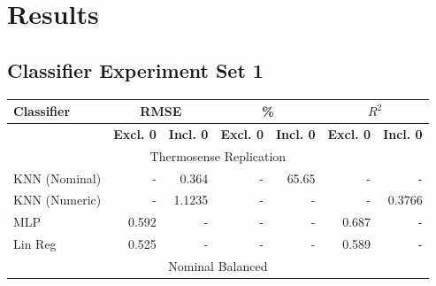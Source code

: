 \documentclass[../thesis/thesis.tex]{subfiles}
\begin{document}
 \chapter{Results}



 \section{Classifier Experiment Set 1}


\begin{table}
\centering
\begin{tabular}{|l|r|r|r|r|r|r|}
\hline
\textbf{Classifier} & \multicolumn{2}{c|}{\textbf{RMSE}}                                            & \multicolumn{2}{c|}{\textbf{\%}}                                              & \multicolumn{2}{c|}{\textbf{$R^2$}}                                           \\ \hline
                    & \multicolumn{1}{l|}{\textbf{Excl. 0}} & \multicolumn{1}{l|}{\textbf{Incl. 0}} & \multicolumn{1}{l|}{\textbf{Excl. 0}} & \multicolumn{1}{l|}{\textbf{Incl. 0}} & \multicolumn{1}{l|}{\textbf{Excl. 0}} & \multicolumn{1}{l|}{\textbf{Incl. 0}} \\ \hline
\multicolumn{7}{|c|}{Thermosense Replication} \\ \hline                                                                                                                                                                                                                       
KNN (Nominal)       & -                                     & 0.364        & -           & 65.65         & -           & -                                     \\ \hline
KNN (Numeric)       & -                                     & 1.1235       & -           & -             & -           & 0.3766                                \\ \hline
MLP                 & 0.592                                 & -            & -           & -             & 0.687       & -                                     \\ \hline
Lin Reg             & 0.525                                 & -            & -           & -             & 0.589       & -                                     \\ \hline
\multicolumn{7}{|c|}{Nominal Balanced}                                                                                                                         \\ \hline

\end{tabular}
\end{table}
\end{document}
